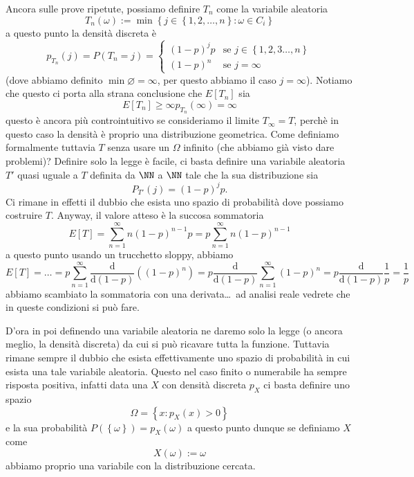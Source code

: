 \documentclass[11pt]{scrartcl}
\newcommand{\dif}{\text{d}}
\newcommand{\eset}{\varnothing}
\begin{document}
	\begin{example}
		Ancora sulle prove ripetute, possiamo definire $T_n$ come la variabile aleatoria
		$$T_n(\omega):=\min\left\{j\in \left\{1,2,\dots,n\right\}:\omega\in C_i\right\}$$
		a questo punto la densità discreta è
		$$p_{T_n}(j)=P(T_n=j)=
		\begin{cases}
			(1-p)^j p & \text{se $j\in \left\{1,2,3\dots,n\right\}$} \\
			(1-p)^n & \text{se $j=\infty$}
		\end{cases}$$
		(dove abbiamo definito $\min\eset=\infty$, per questo abbiamo il caso $j=\infty$). Notiamo che questo ci porta alla strana conclusione che $E[T_n]$ sia
		$$E[T_n]\ge \infty p_{T_n}(\infty)=\infty$$
		questo è ancora più controintuitivo se consideriamo il limite $T_\infty=T$, perchè in questo caso la densità è proprio una distribuzione geometrica. Come definiamo formalmente tuttavia $T$ senza usare un $\Omega$ infinito (che abbiamo già visto dare problemi)? Definire solo la legge è facile, ci basta definire una variabile aleatoria $T'$ quasi uguale a $T$ definita da $\NN$ a $\NN$ tale che la sua distribuzione sia
		$$P_{T'}(j)=(1-p)^j p.$$
		Ci rimane in effetti il dubbio che esista uno spazio di probabilità dove possiamo costruire $T$. Anyway, il valore atteso è la succosa sommatoria
		$$E[T]=\sum_{n=1}^{\infty}n(1-p)^{n-1}p=p\sum_{n=1}^{\infty}n(1-p)^{n-1}$$
		a questo punto usando un trucchetto sloppy, abbiamo
		$$E[T]=\dots=p\sum_{n=1}^{\infty}\frac{\dif }{\dif (1-p)}\left((1-p)^n\right)=p\frac{\dif}{\dif(1-p)}\sum_{n=1}^{\infty}(1-p)^n=p\frac{\dif}{\dif (1-p)}\frac{1}{p}=\frac{1}{p}$$
		abbiamo scambiato la sommatoria con una derivata\dots\, ad analisi reale vedrete che in queste condizioni si può fare. 
	\end{example}
	D'ora in poi definendo una variabile aleatoria ne daremo solo la legge (o ancora meglio, la densità discreta) da cui si può ricavare tutta la funzione. Tuttavia rimane sempre il dubbio che esista effettivamente uno spazio di probabilità in cui esista una tale variabile aleatoria. Questo nel caso finito o numerabile ha sempre risposta positiva, infatti data una $X$ con densità discreta $p_X$ ci basta definire uno spazio 
	$$\Omega=\left\{x:p_X(x)>0\right\}$$
	e la sua probabilità $P\left(\left\{\omega\right\}\right)=p_X(\omega)$ a questo punto dunque se definiamo $X$ come
	$$X(\omega):=\omega$$
	abbiamo proprio una variabile con la distribuzione cercata.
	
\end{document}
